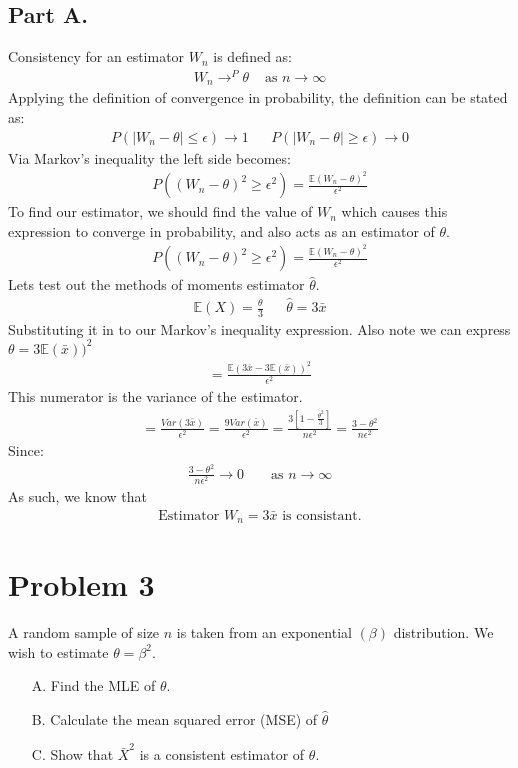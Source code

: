 \documentclass{article}
\begin{document}
\subsection*{Part A.}
Consistency for an estimator $W_n$ is defined as:
\begin{align*}
W_n \rightarrow^P \theta & \text{ as } n \rightarrow \infty
\end{align*}
Applying the definition of convergence in probability, the definition can be stated as:
\begin{align*}
P(|W_n-\theta| \leq \epsilon) \rightarrow 1 && P(|W_n-\theta| \geq \epsilon) \rightarrow 0
\end{align*}
Via Markov's inequality the left side becomes:
\begin{align*}
P((W_n-\theta)^2 \geq \epsilon^2) = \frac{\mathbb{E}(W_n-\theta)^2}{\epsilon^2}
\end{align*}
To find our estimator, we should find the value of $W_n$ which causes this expression to converge in probability, and also acts as an estimator of $\theta$.
\begin{align*}
P((W_n-\theta)^2 \geq \epsilon^2) = \frac{\mathbb{E}(W_n-\theta)^2}{\epsilon^2}
\end{align*}
Lets test out the methods of moments estimator $\hat{\theta}$.
\begin{align*}
\mathbb{E}(X) = \frac{\theta}{3} && \hat{\theta} = 3\bar{x}
\end{align*}
Substituting it in to our Markov's inequality expression. Also note we can express $\theta = 3\mathbb{E}(\bar{x}))^2$
\begin{align*}
 = \frac{\mathbb{E}(3\bar{x}-3\mathbb{E}(\bar{x}))^2}{\epsilon^2}
\end{align*}
This numerator is the variance of the estimator.
\begin{align*}
 = \frac{Var(3\bar{x})}{\epsilon^2} = \frac{9Var(\bar{x})}{\epsilon^2} = \frac{3[1-\frac{\theta^2}{3}]}{n \epsilon^2} = \frac{3-\theta^2}{n\epsilon^2}
\end{align*}
Since:
\begin{align*}
\frac{3-\theta^2}{n\epsilon^2} \rightarrow 0 && \text{ as } n \rightarrow \infty
\end{align*}
As such, we know that
\begin{align*}
\boxed{ \text{Estimator } W_n = 3\bar{x} \text{ is consistant.}      }
\end{align*}

\clearpage

\section*{Problem 3}
A random sample of size $n$ is taken from an exponential $(\beta)$ distribution. We wish to estimate $\theta=\beta^2$.
\begin{enumerate}
\item[A.] Find the MLE of $\theta$.
\item[B.] Calculate the mean squared error (MSE) of $\hat{\theta}$
\item[C.] Show that $\bar{X}^2$ is a consistent estimator of $\theta$.
\end{enumerate}
\end{document}
